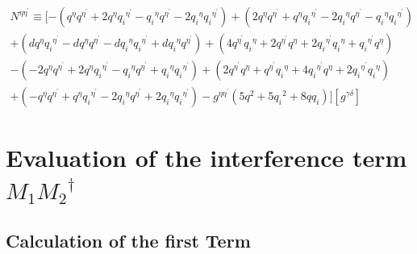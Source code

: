 \begin{equation}
\begin{split}
N^{{\eta}{{\eta}^{\prime}}}\equiv [-({q}^{{\eta}}{q}^{{\eta}^{\prime}}+2{q}^{{\eta}}{q_i}^{{\eta}^{\prime}}-{q_i}^{{\eta}}{q}^{{\eta}^{\prime}}-2{q_i}^{{\eta}}{q_i}^{{\eta}^{\prime}})
+(2{q}^{{\eta}}{q}^{{\eta}^{\prime}}+{q}^{{\eta}}{q_i}^{{\eta}^{\prime}}-2{q_i}^{{\eta}}{q}^{{\eta}^{\prime}}-{q_i}^{{\eta}}{q_i}^{{\eta}^{\prime}})\\+(d{q}^{{\eta}}{q_i}^{{\eta}^{\prime}}-d{q}^{{\eta}}{q}^{{\eta}^{\prime}}-d{q_i}^{{\eta}}{q_i}^{{\eta}^{\prime}}+d{q_i}^{{\eta}}{q}^{{\eta}^{\prime}})+(4{q}^{{\eta}^{\prime}}{q_i}^{{\eta}}+2{q}^{{\eta}^{\prime}}{q}^{{\eta}}+2{q_i}^{{\eta}^{\prime}}{q_i}^{{\eta}}+{q_i}^{{\eta}^{\prime}}{q}^{{\eta}})\\
-(-2{q}^{{\eta}}{q}^{{\eta}^{\prime}}+2{q}^{{\eta}}{q_i}^{{\eta}^{\prime}}-{q_i}^{{\eta}}{q}^{{\eta}^{\prime}}+{q_i}^{{\eta}}{q_i}^{{\eta}^{\prime}})+(2{q}^{{\eta}^{\prime}}{q}^{{\eta}}+{q}^{{\eta}^{\prime}}{q_i}^{{\eta}}+4{q_i}^{{\eta}^{\prime}}{q}^{{\eta}}+2{q_i}^{{\eta}^{\prime}}{q_i}^{{\eta}})\\+(-{q}^{{\eta}}{q}^{{\eta}^{\prime}}+{q}^{{\eta}}{q_i}^{{\eta}^{\prime}}-2{q_i}^{{\eta}}{q}^{{\eta}^{\prime}}+2{q_i}^{{\eta}}{q_i}^{{\eta}^{\prime}})
-g^{{\eta}{{\eta}^{\prime}}}(5{q}^2+5{q_i}^2+8qq_i)][g^{{\gamma}{\delta}}]
\end{split}
\end{equation}

\section*{Evaluation of the interference term $M_1 {M_2}^{\dagger}$}
\label{EvaIntGG}

\subsection*{Calculation of the first Term}


